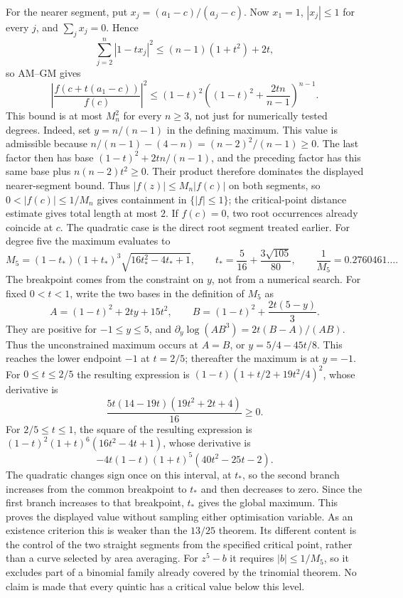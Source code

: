 For the nearer segment, put $x_j=(a_1-c)/(a_j-c)$. Now $x_1=1$,
$|x_j|\le1$ for every $j$, and $\sum_jx_j=0$. Hence
\[
 \sum_{j=2}^n|1-tx_j|^2
 \le (n-1)(1+t^2)+2t,
\]
so AM--GM gives
\[
 \left|\frac{f(c+t(a_1-c))}{f(c)}\right|^2
 \le(1-t)^2\left((1-t)^2+\frac{2tn}{n-1}\right)^{n-1}.
\]
This bound is at most $M_n^2$ for every $n\ge3$, not just for
numerically tested degrees. Indeed, set $y=n/(n-1)$ in the defining
maximum. This value is admissible because
$n/(n-1)-(4-n)=(n-2)^2/(n-1)\ge0$. The last factor then has base
$(1-t)^2+2tn/(n-1)$, and the preceding factor has this same base plus
$n(n-2)t^2\ge0$. Their product therefore dominates the displayed
nearer-segment bound. Thus $|f(z)|\le M_n|f(c)|$ on both segments, so
$0<|f(c)|\le1/M_n$ gives containment in $\{|f|\le1\}$; the
critical-point distance estimate gives total length at most $2$.
If $f(c)=0$, two root occurrences already coincide at $c$.
The quadratic case is the direct root segment treated earlier.
For degree five the maximum evaluates to
\[
 M_5=(1-t_*)(1+t_*)^3\sqrt{16t_*^2-4t_*+1},
 \qquad
 t_*=\frac{5}{16}+\frac{3\sqrt{105}}{80},
 \qquad
 \frac{1}{M_5}=0.2760461\ldots.
\]
The breakpoint comes from the constraint on $y$, not from a numerical
search. For fixed $0<t<1$, write the two bases in the definition of
$M_5$ as
\[
 A=(1-t)^2+2ty+15t^2,\qquad
 B=(1-t)^2+\frac{2t(5-y)}3.
\]
They are positive for $-1\le y\le5$, and
$\partial_y\log(AB^3)=2t(B-A)/(AB)$. Thus the unconstrained maximum
occurs at $A=B$, or $y=5/4-45t/8$. This reaches the lower endpoint
$-1$ at $t=2/5$; thereafter the maximum is at $y=-1$.
For $0\le t\le2/5$ the resulting expression is
$(1-t)(1+t/2+19t^2/4)^2$, whose derivative is
\[
 \frac{5t(14-19t)(19t^2+2t+4)}{16}\ge0.
\]
For $2/5\le t\le1$, the square of the resulting expression is
$(1-t)^2(1+t)^6(16t^2-4t+1)$, whose derivative is
\[
 -4t(1-t)(1+t)^5(40t^2-25t-2).
\]
The quadratic changes sign once on this interval, at $t_*$, so the
second branch increases from the common breakpoint to $t_*$ and then
decreases to zero. Since the first branch increases to that breakpoint,
$t_*$ gives the global maximum. This proves the displayed value without
sampling either optimisation variable.
As an existence criterion this is weaker than the $13/25$ theorem.
Its different content is the control of the two straight segments from
the specified critical point, rather than a curve selected by area
averaging. For $z^5-b$ it requires $|b|\le1/M_5$, so it excludes part
of a binomial family already covered by the trinomial theorem. No claim
is made that every quintic has a critical value below this level.

